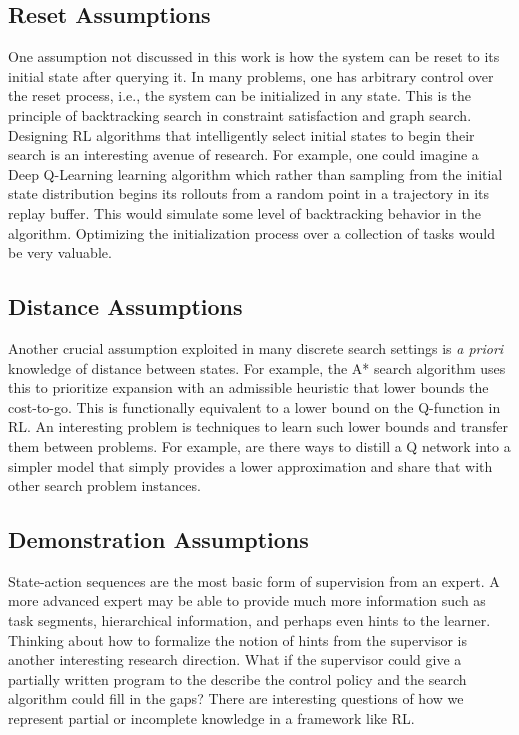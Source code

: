 \subsection*{Reset Assumptions}
One assumption not discussed in this work is how the system can be reset to its initial state after querying it. In many problems, one has arbitrary control over the reset process, i.e., the system can be initialized in any state.
This is the principle of backtracking search in constraint satisfaction and graph search. 
Designing RL algorithms that intelligently select initial states to begin their search is an interesting avenue of research.
For example, one could imagine a Deep Q-Learning learning algorithm which rather than sampling from the initial state distribution begins its rollouts from a random point in a trajectory in its replay buffer.
This would simulate some level of backtracking behavior in the algorithm.
Optimizing the initialization process over a collection of tasks would be very valuable.

\subsection*{Distance Assumptions}
Another crucial assumption exploited in many discrete search settings is \emph{a priori} knowledge of distance between states. For example, the A* search algorithm uses this to prioritize expansion with an admissible heuristic that lower bounds the cost-to-go.
This is functionally equivalent to a lower bound on the Q-function in RL.
An interesting problem is techniques to learn such lower bounds and transfer them between problems.
For example, are there ways to distill a Q network into a simpler model that simply provides a lower approximation and share that with other search problem instances.

\subsection*{Demonstration Assumptions}
State-action sequences are the most basic form of supervision from an expert. 
A more advanced expert may be able to provide much more information such as task segments, hierarchical information, and perhaps even hints to the learner. 
Thinking about how to formalize the notion of hints from the supervisor is another interesting research direction.
What if the supervisor could give a partially written program to the describe the control policy and the search algorithm could fill in the gaps?
There are interesting questions of how we represent partial or incomplete knowledge in a framework like RL.


